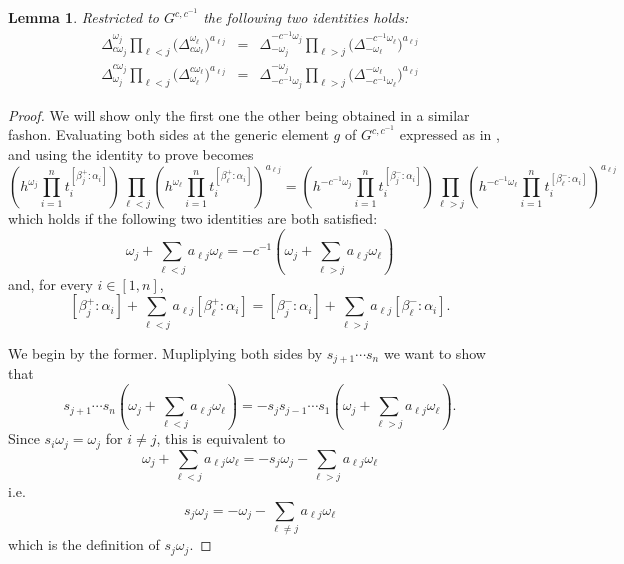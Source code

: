 \documentclass[12pt]{amsart}
\newtheorem{lemma}[theorem]{Lemma}
\numberwithin{equation}{section}
\begin{document}
\begin{lemma}
  Restricted to $G^{c,c^{-1}}$ the following two identities holds:
  \label{lemma:coefficients_identities}
  \begin{eqnarray}
    \Delta_{c\omega_j}^{\omega_j}
    \prod_{\ell<j}\big(\Delta_{c\omega_\ell}^{\omega_\ell}\big)^{a_{\ell j}}
    &=&
    \Delta_{-\omega_j}^{-c^{-1}\omega_j}
    \prod_{\ell>j}\big(\Delta_{-\omega_\ell}^{-c^{-1}\omega_\ell}\big)^{a_{\ell j}}\\
    \Delta_{\omega_j}^{c\omega_j}
    \prod_{\ell<j}\big(\Delta_{\omega_\ell}^{c\omega_\ell}\big)^{a_{\ell j}}
    &=&
    \Delta_{-c^{-1}\omega_j}^{-\omega_j}
    \prod_{\ell>j}\big(\Delta_{-c^{-1}\omega_\ell}^{-\omega_\ell}\big)^{a_{\ell j}}
  \end{eqnarray}
\end{lemma}
\begin{proof}
  We will show only the first one the other being obtained in a similar fashon.
  Evaluating both sides at the generic element $g$ of $G^{c,c^{-1}}$ expressed as in , and using  the identity to prove becomes
  \[
    \left(h^{\omega_j}\prod_{i=1}^n t_{i}^{[\beta_j^+:\alpha_i]}\right)
    \prod_{\ell<j}\left(h^{\omega_\ell}\prod_{i=1}^n t_{i}^{[\beta_\ell^+:\alpha_i]}\right)^{a_{\ell j}}
    =
    \left(h^{-c^{-1}\omega_j}\prod_{i=1}^n t_{i}^{[\beta_j^-:\alpha_i]}\right)
    \prod_{\ell>j}\left(h^{-c^{-1}\omega_\ell}\prod_{i=1}^n t_{i}^{[\beta_\ell^-:\alpha_i]}\right)^{a_{\ell j}}
  \]
  which holds if the following two identities are both satisfied:
  \begin{equation}
    \omega_j + \sum_{\ell<j} a_{\ell j}\omega_\ell
    =
    -c^{-1}\left(\omega_j + \sum_{\ell>j} a_{\ell j}\omega_\ell\right)
  \end{equation}
  and, for every $i\in[1,n]$,
  \begin{equation}
    \label{eq:identity_betas}
    [\beta_j^+:\alpha_i]+\sum_{\ell<j}a_{\ell j}[\beta_\ell^+:\alpha_i]
    =
    [\beta_j^-:\alpha_i]+\sum_{\ell>j}a_{\ell j}[\beta_\ell^-:\alpha_i].
  \end{equation}

  We begin by the former. 
  Mupliplying both sides by $s_{j+1}\cdots s_n$ we want to show that
  \[
    s_{j+1}\cdots s_n\left(\omega_j + \sum_{\ell<j} a_{\ell j}\omega_\ell\right)=
    -s_js_{j-1}\cdots s_1\left(\omega_j + \sum_{\ell>j} a_{\ell j}\omega_\ell\right).
  \]
  Since $s_i\omega_j=\omega_j$ for $i\neq j$, this is equivalent to
  \[
    \omega_j + \sum_{\ell<j} a_{\ell j}\omega_\ell
    =
    -s_j\omega_j-\sum_{\ell>j} a_{\ell j}\omega_\ell
  \]
  i.e. 
  \begin{equation}
    s_j\omega_j
    =
    -\omega_j-\sum_{\ell\neq j}a_{\ell j}\omega_\ell
  \end{equation}
  which is the definition of $s_j\omega_j$.


\end{proof}
\end{document}
